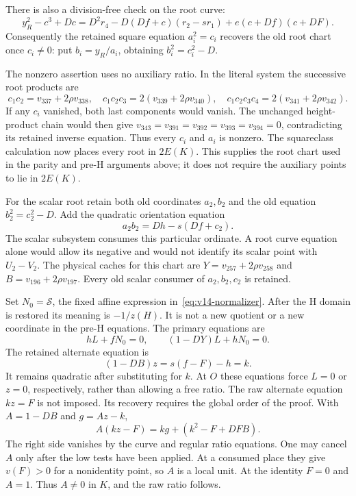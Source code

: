 There is also a division-free check on the root curve:
\begin{equation}\label{eq:v14-root-identity}
 y_R^2-c^3+Dc
 =D^2r_4-D(Df+c)(r_2-sr_1)
       +e(c+Df)(c+DF).
\end{equation}
Consequently the retained square equation $a_i^2=c_i$ recovers
the old root chart once $c_i\ne0$: put $b_i=y_R/a_i$, obtaining
$b_i^2=c_i^2-D$.

The nonzero assertion uses no auxiliary ratio. In the literal
system the successive root products are
\[
 c_1c_2=v_{337}+2\rho v_{338},\quad
 c_1c_2c_3=2(v_{339}+2\rho v_{340}),\quad
 c_1c_2c_3c_4=2(v_{341}+2\rho v_{342}).
\]
If any $c_i$ vanished, both last components would vanish.
The unchanged height-product chain would then give
$v_{343}=v_{391}=v_{392}=v_{393}=v_{394}=0$, contradicting its
retained inverse equation. Thus every $c_i$ and $a_i$ is nonzero.
The squareclass calculation now places every root in $2E(K)$.
This supplies the root chart used in the parity and pre-H
arguments above; it does not require the auxiliary points to
lie in $2E(K)$.

For the scalar root retain both old coordinates $a_2,b_2$ and
the old equation $b_2^2=c_2^2-D$. Add the quadratic orientation
equation
\begin{equation}\label{eq:v14-S-orientation}
 a_2b_2=Dh-s(Df+c_2).
\end{equation}
The scalar subsystem consumes this particular ordinate. A root
curve equation alone would allow its negative and would not
identify its scalar point with $U_2-V_2$.
The physical caches for this chart are
$Y=v_{257}+2\rho v_{258}$ and $B=v_{196}+2\rho v_{197}$.
Every old scalar consumer of $a_2,b_2,c_2$ is retained.

Set $N_0=\mathcal S$, the fixed affine expression
in~\eqref{eq:v14-normalizer}. After the H domain is restored
its meaning is $-1/z(H)$. It is not a new quotient or a new
coordinate in the pre-H equations. The primary equations are
\begin{equation}\label{eq:v14-primary-ratios}
 hL+fN_0=0,\qquad (1-DY)L+hN_0=0.
\end{equation}
The retained alternate equation is
\begin{equation}\label{eq:v14-regular-ratio}
 (1-DB)z=s(f-F)-h=k.
\end{equation}
It remains quadratic after substituting for $k$.
At $O$ these equations force $L=0$ or $z=0$, respectively,
rather than allowing a free ratio. The raw alternate equation
$kz=F$ is not imposed. Its recovery requires the global order of
the proof. With $A=1-DB$ and $g=Az-k$,
\begin{equation}\label{eq:v14-raw-ratio}
 A(kz-F)=kg+(k^2-F+DFB).
\end{equation}
The right side vanishes by the curve and regular ratio equations.
One may cancel $A$ only after the low tests have been applied.
At a consumed place they give $v(F)>0$ for a nonidentity point,
so $A$ is a local unit. At the identity $F=0$ and $A=1$.
Thus $A\ne0$ in $K$, and the raw ratio follows.

